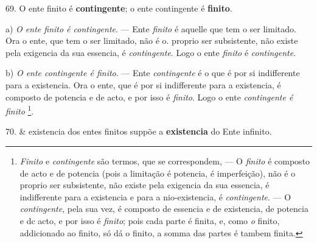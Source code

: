  69. O ente finito é \textbf{contingente}; o ente contingente é \textbf{finito}.

a) \emph{O ente finito é contingente}. --- Ente \emph{finito} é aquelle que tem o ser limitado. Ora o ente, que tem o ser limitado, não é o. proprio ser subsistente, não existe pela exigencia da sua essencia, é \emph{contingente}. Logo o ente \emph{finito} é \emph{contingente}.

b) \emph{O ente contingente é finito}. --- Ente \emph{contingente} é o que é por si indifferente para a existencia. Ora o ente, que é por si indifferente para a existencia, é composto de potencia e de acto, e por isso é \emph{finito}. Logo o ente \emph{contingente é finito} \footnote{\emph{Finito} e \emph{contingente} são termos, que se correspondem, --- O \emph{finito} é composto de acto e de potencia (pois a limitação é potencia, é imperfeição), não é o proprio ser subsistente, não existe pela exigencia da sua essencia, é indifferente para a existencia e para a nio-existencia, é \emph{contingente}. --- O \emph{contingente}, pela sua vez, é composto de essencia e de existencia, de potencia e dc acto, e por isso é \emph{finito}; pois cada parte é finita, e, como \emph{o} finito, addicionado ao finito, só dá o finito, a somma das partes é tambem finita.}.

70. \& existencia dos entes finitos suppõe a \textbf{existencia} do Ente infinito.

